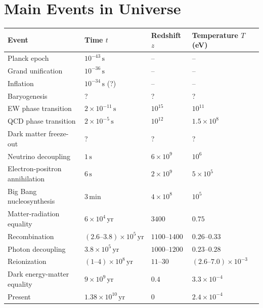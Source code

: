 \section{Main Events in Universe}
\begin{center}
\begin{tabular}{llll}
\toprule
\textbf{Event} & \textbf{Time $t$} & \textbf{Redshift $z$} & \textbf{Temperature $T$ (eV)} \\
\midrule
Planck epoch & $10^{-43}\,\mathrm{s}$ & -- & -- \\
Grand unification & $10^{-36}\,\mathrm{s}$ & -- & -- \\
Inflation & $10^{-34}\,\mathrm{s}$ (?) & -- & -- \\
Baryogenesis & ? & ? & ? \\
EW phase transition & $2\times10^{-11}\,\mathrm{s}$ & $10^{15}$ & $10^{11}$ \\
QCD phase transition & $2\times10^{-5}\,\mathrm{s}$ & $10^{12}$ & $1.5\times10^{8}$ \\
Dark matter freeze-out & ? & ? & ? \\
Neutrino decoupling & $1\,\mathrm{s}$ & $6\times10^{9}$ & $10^{6}$ \\
Electron-positron annihilation & $6\,\mathrm{s}$ & $2\times10^{9}$ & $5\times10^{5}$ \\
Big Bang nucleosynthesis & $3\,\mathrm{min}$ & $4\times10^{8}$ & $10^{5}$ \\
Matter-radiation equality & $6\times10^{4}\,\mathrm{yr}$ & $3400$ & $0.75$ \\
Recombination & $(2.6\text{--}3.8)\times10^{5}\,\mathrm{yr}$ & $1100\text{--}1400$ & $0.26\text{--}0.33$ \\
Photon decoupling & $3.8\times10^{5}\,\mathrm{yr}$ & $1000\text{--}1200$ & $0.23\text{--}0.28$ \\
Reionization & $(1\text{--}4)\times10^{8}\,\mathrm{yr}$ & $11\text{--}30$ & $(2.6\text{--}7.0)\times10^{-3}$ \\
Dark energy-matter equality & $9\times10^{9}\,\mathrm{yr}$ & $0.4$ & $3.3\times10^{-4}$ \\
Present & $1.38\times10^{10}\,\mathrm{yr}$ & $0$ & $2.4\times10^{-4}$ \\
\bottomrule
\end{tabular}
\end{center}

\clearpage
